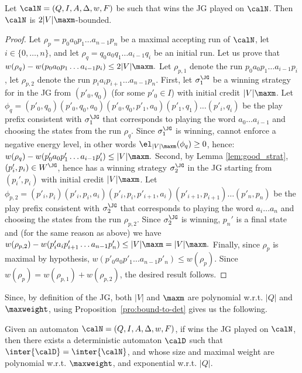 \documentclass[a4paper]{article}
\begin{document}
\begin{proposition}\label{pro:JG_delay}
	Let $\calN = (Q,I,A,\Delta,w,F)$ be such that \eve wins the JG played on
	$\calN$. Then $\calN$ is $2|V|\maxm$-bounded.
\end{proposition}
\begin{proof}
	Let $\rho_p = p_0 a_0 p_1 \dots a_{n-1} p_n$ be a maximal accepting run
	of $\calN$, let $i \in \{0, \ldots, n\}$, and let $\rho_q = q_0 a_0 q_1
	\dots a_{i-1} q_i$ be an initial run.  Let us prove that
	\(
		w(\rho_q) - w(p_0 a_0 p_1 \dots a_{i-1} p_i) \leq 2|V|\maxm.
	\)
	Let $\rho_{p,1}$ denote the run $p_0 a_0 p_{1} \dots a_{i-1} p_{i}$, let
	$\rho_{p,2}$ denote the run $p_i a_i p_{i+1} \dots a_{n-1} p_{n}$.
	First, let $\sigma^{\JG}_1$ be a winning strategy for \eve in the JG from
	$(p'_0,q_0)$ (for some $p'_0 \in I$) with initial credit $|V|\maxm$. Let
	$\phi_q = (p'_0,q_0)(p'_0,q_0,a_0)(p'_0,q_0,p'_1,a_0)(p'_1,q_1) \dots
	(p'_i,q_i)$ be the play prefix consistent with $\sigma^{\JG}_1$  that
	corresponds to \adam playing the word $a_0 \ldots a_{i-1}$ and choosing
	the states from the run $\rho_q$.  Since $\sigma^{\JG}_1$ is winning,
	\adam cannot enforce a negative energy level, in other words
	$\el_{|V|\maxm}(\phi_q) \geq 0$, hence:
	\(
		w(\rho_q) - w(p'_0 a_0 p'_1 \dots a_{i-1} p'_i) \leq |V|\maxm.
	\)
	Second, by Lemma \ref{lem:good_strat}, $(p_i',p_i) \in W^{\JG}$, hence
	\eve has a winning strategy $\sigma^{\JG}_2$ in the JG starting from
	$(p_i',p_i)$ with initial credit $|V|\maxm$. Let $\phi_{p,2} =
	(p'_i,p_i) (p'_i,p_i,a_i) (p'_i,p_i,p'_{i+1},a_i) (p'_{i+1},p_{i+1})
	\dots (p'_n,p_n)$ be the play prefix consistent with $\sigma^{\JG}_2$
	that corresponds to \adam playing the word $a_i \ldots a_n$ and choosing
	the states from the run $\rho_{p,2}$.  Since $\sigma^{\JG}_2$ is
	winning, $p_n'$ is a final state and (for the same reason as above) we
	have
	\(
		w(\rho_{p,2}) - w(p'_i a_i p'_{i+1} \dots a_{n-1} p'_n)  \leq
		|V|\maxm = |V|\maxm.
	\)
	Finally, since  $\rho_p$ is maximal by hypothesis, $w(p'_0 a_0 p'_1
	\dots a_{n-1} p'_n) \leq w(\rho_p)$.  Since $w(\rho_p) = w(\rho_{p,1}) +
	w(\rho_{p,2})$, the desired result follows. 
\end{proof}

Since, by definition of the JG, both $|V|$ and $\maxm$ are polynomial w.r.t.
$|Q|$ and $\maxweight$, using Proposition~\ref{pro:bound-to-det} gives us the
following.
%
\begin{theorem}\label{thm:win-joker-det}
	Given an automaton $\calN = (Q,I,A,\Delta,w,F)$,
	if \eve wins the JG played on $\calN$, then there exists a
	deterministic automaton $\calD$ such that $\inter{\calD} =
	\inter{\calN}$, and whose size and maximal weight are
	polynomial w.r.t. $\maxweight$, and exponential w.r.t. $|Q|$.
\end{theorem}
\end{document}
